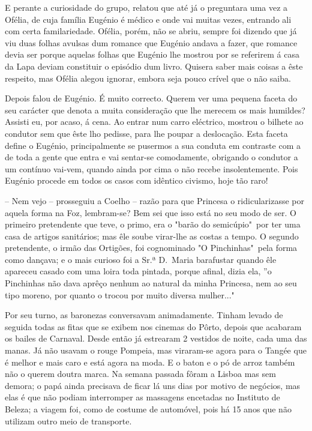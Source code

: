 \documentclass[9pt]{article}
\begin{document}
E perante a curiosidade do grupo, relatou que até já o preguntara
uma vez a Ofélia, de cuja fa\-mí\-lia Eugé\-nio é médico e onde vai muitas
vezes, entrando ali com certa familariedade. Ofélia, porém, não se abriu,
sempre foi dizendo que já viu duas fo\-lhas avulsas dum romance que
Eugé\-nio andava a fazer, que romance devia ser porque aquelas fo\-lhas que
Eugé\-nio lhe mostrou por se referirem á casa da Lapa deviam constituir
o episódio dum livro. Quisera saber mais coisas a êste respeito, mas
Ofélia alegou ignorar, embora seja pouco crível que o não saiba.

Depois falou de Eugé\-nio. É muito correcto. Querem ver uma pequena
faceta do seu carácter que denota a muita considera\-ção que lhe merecem
os mais humildes? Assisti eu, por acaso, á cena. Ao entrar num carro
eléctrico, mostrou o bi\-lhete ao condutor sem que êste lho pedisse,
para lhe poupar a desloca\-ção. Esta faceta define o Eugé\-nio, principalmente se pusermos a sua conduta em contraste com a de toda a gente que
entra e vai sentar-se comodamente, obrigando o condutor a um contínuo
vai-vem, quan\-do ainda por cima o não recebe insolentemente. Pois Eugé\-nio
procede em todos os casos com idêntico civismo, hoje tão raro!

-- Nem vejo -- prosseguiu a Coe\-lho -- razão para que Princesa o ridicularizasse por aquela forma na Foz, lembram-se? Bem sei que isso está
no seu modo de ser. O primeiro pretendente que teve, o primo, era o "barão
do semicúpio"\ por ter uma casa de artigos sanitários; mas êle soube virar-\-lhe as costas a tempo. O segundo pretendente, o irmão das Ortigões,
foi cognominado "O Pinchinhas"\ pela forma como dan\-çava; e o mais curioso foi a Sr.ª D.\ Maria barafustar quan\-do êle apareceu casado com uma
loira toda pintada, porque afinal, dizia ela, ”o Pinchinhas não dava aprêço
nenhum ao natural da minha Princesa, nem ao seu tipo moreno, por quanto o
trocou por muito diversa mu\-lher..."

Por seu turno, as baronezas conversavam animadamente. Tinham levado
de seguida todas as fitas que se exibem nos cinemas do Pôrto, depois que
acabaram os bailes de Carnaval. Desde então já es\-tre\-aram 2 vestidos de
noite, cada uma das manas. Já não usavam o rouge Pompeia, mas viraram-se
agora para o Tangée que é me\-lhor e mais caro e está agora na moda. E o
baton e o pó de arroz também não o querem doutra marca. Na semana passada fôram a Lisboa mas sem demora; o papá ainda precisava de fi\-car lá
uns dias por motivo de negócios, mas elas é que não podiam interromper
as massagens encetadas no Instituto de Beleza; a viagem foi, como de costume de automóvel, pois há 15 anos que não utilizam outro meio de transporte.
\end{document}
